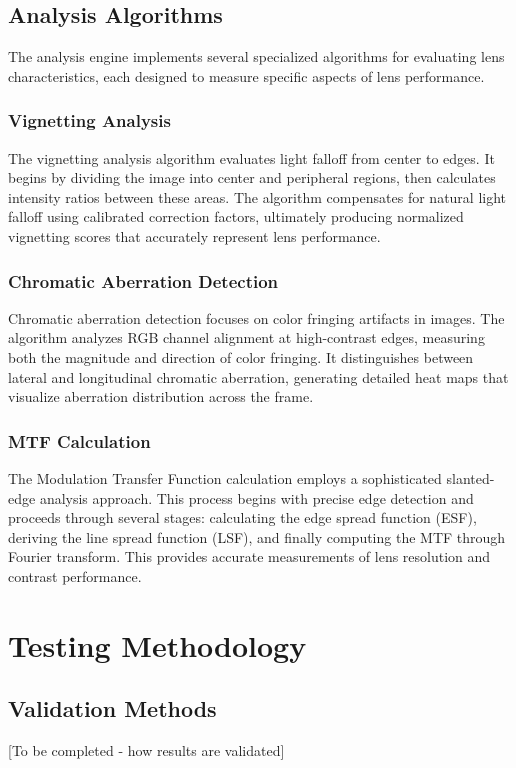 \subsection{Analysis Algorithms}
The analysis engine implements several specialized algorithms for evaluating lens characteristics, each designed to measure specific aspects of lens performance.

\subsubsection{Vignetting Analysis}
The vignetting analysis algorithm evaluates light falloff from center to edges. It begins by dividing the image into center and peripheral regions, then calculates intensity ratios between these areas. The algorithm compensates for natural light falloff using calibrated correction factors, ultimately producing normalized vignetting scores that accurately represent lens performance.

\subsubsection{Chromatic Aberration Detection}
Chromatic aberration detection focuses on color fringing artifacts in images. The algorithm analyzes RGB channel alignment at high-contrast edges, measuring both the magnitude and direction of color fringing. It distinguishes between lateral and longitudinal chromatic aberration, generating detailed heat maps that visualize aberration distribution across the frame.

\subsubsection{MTF Calculation}
The Modulation Transfer Function calculation employs a sophisticated slanted-edge analysis approach. This process begins with precise edge detection and proceeds through several stages: calculating the edge spread function (ESF), deriving the line spread function (LSF), and finally computing the MTF through Fourier transform. This provides accurate measurements of lens resolution and contrast performance.

\section{Testing Methodology}

\subsection{Validation Methods}
[To be completed - how results are validated]

